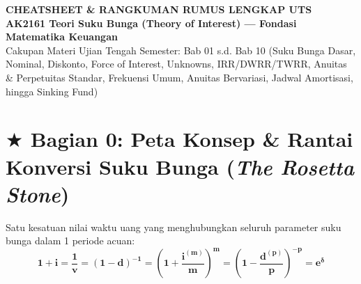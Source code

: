 \documentclass[10pt,a4paper]{article}
\begin{document}
\begin{tcolorbox}[
    enhanced,
    colback=primaryblue,
    colframe=primaryblue!80!black,
    arc=2mm,
    boxrule=1pt,
    left=4mm, right=4mm, top=3mm, bottom=3mm
]
\begin{center}
    {\color{white}\LARGE\textbf{\textsf{CHEATSHEET \& RANGKUMAN RUMUS LENGKAP UTS}}}\\[0.25em]
    {\color{white}\large\textbf{\textsf{AK2161 Teori Suku Bunga (Theory of Interest) --- Fondasi Matematika Keuangan}}}\\[0.25em]
    {\color{white!85}\small\textsf{Cakupan Materi Ujian Tengah Semester: Bab 01 s.d. Bab 10 (Suku Bunga Dasar, Nominal, Diskonto, Force of Interest, Unknowns, IRR/DWRR/TWRR, Anuitas \& Perpetuitas Standar, Frekuensi Umum, Anuitas Bervariasi, Jadwal Amortisasi, hingga Sinking Fund)}}
\end{center}
\end{tcolorbox}

\vspace{0.1em}

\section*{\large $\bigstar$ Bagian 0: Peta Konsep \& Rantai Konversi Suku Bunga (\textit{The Rosetta Stone})}

\begin{teoremabox}
Satu kesatuan nilai waktu uang yang menghubungkan seluruh parameter suku bunga dalam 1 periode acuan:
\begin{equation*}
    \mathbf{1 + i = \frac{1}{v} = (1 - d)^{-1} = \left( 1 + \frac{i^{(m)}}{m} \right)^m = \left( 1 - \frac{d^{(p)}}{p} \right)^{-p} = e^{\delta}}
\end{equation*}
\end{teoremabox}
\end{document}
